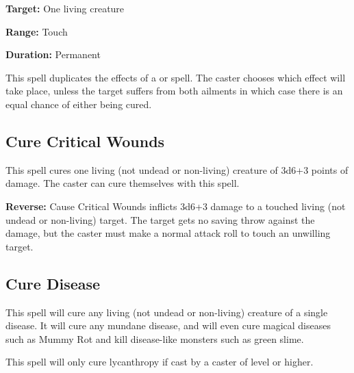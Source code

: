 \begin{multicols*}{2}
{\textbf{Target:} One living creature

\textbf{Range:} Touch

\textbf{Duration:} Permanent}

This spell duplicates the effects of a  or  spell. The caster chooses which effect will take place, unless the target suffers from both ailments in which case there is an equal chance of either being cured.

\subsection{Cure Critical Wounds}\label{spell:Cure Critical Wounds}

This spell cures one living (not undead or non-living) creature of 3d6+3 points of damage. The caster can cure themselves with this spell.

\textbf{Reverse:} \hypertarget{spell:Cause Critical Wounds}{Cause Critical Wounds} inflicts 3d6+3 damage to a touched living (not undead or non-living) target. The target gets no saving throw against the damage, but the caster must make a normal attack roll to touch an unwilling target.

\subsection{Cure Disease}\label{spell:Cure Disease}

This spell will cure any living (not undead or non-living) creature of a single disease. It will cure any mundane disease, and will even cure magical diseases such as Mummy Rot and kill disease-like monsters such as green slime.

This spell will only cure lycanthropy if cast by a caster of  level or higher.


\end{multicols*}
